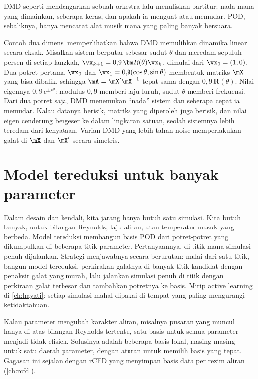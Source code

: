 DMD seperti mendengarkan sebuah orkestra lalu menuliskan partitur: nada mana yang dimainkan, seberapa
keras, dan apakah ia menguat atau memudar. POD, sebaliknya, hanya mencatat alat musik mana yang paling
banyak bersuara.

Contoh dua dimensi memperlihatkan bahwa DMD memulihkan dinamika linear secara eksak. Misalkan sistem berputar sebesar sudut
$\theta$ dan meredam sepuluh persen di setiap langkah, $\vx_{k+1}=0{,}9\,\bm R(\theta)\vx_k$, dimulai dari $\vx_0=(1,0)$. Dua
potret pertama $\vx_0$ dan $\vx_1=0{,}9(\cos\theta,\sin\theta)$ membentuk matriks $\mX$ yang bisa dibalik, sehingga
$\mA=\mX'\mX^{-1}$ tepat sama dengan $0{,}9\,\bm R(\theta)$. Nilai eigennya $0{,}9\,e^{\pm i\theta}$: modulus $0{,}9$ memberi laju
luruh, sudut $\theta$ memberi frekuensi. Dari dua potret saja, DMD menemukan ``nada'' sistem dan seberapa cepat ia memudar.
Kalau datanya berisik, matriks yang diperoleh juga berisik, dan nilai eigen cenderung bergeser ke dalam lingkaran satuan,
seolah sistemnya lebih teredam dari kenyataan. Varian DMD yang lebih tahan noise memperlakukan galat di $\mX$ dan $\mX'$ secara
simetris.

\section{Model tereduksi untuk banyak parameter}

Dalam desain dan kendali, kita jarang hanya butuh satu simulasi. Kita butuh banyak, untuk bilangan Reynolds, laju aliran,
atau temperatur masuk yang berbeda. Model tereduksi  membangun basis POD dari potret-potret yang
dikumpulkan di beberapa titik parameter. Pertanyaannya, di titik mana simulasi penuh dijalankan. Strategi 
menjawabnya secara berurutan: mulai dari satu titik, bangun model tereduksi, perkirakan galatnya di banyak titik kandidat
dengan penaksir galat yang murah, lalu jalankan simulasi penuh di titik dengan perkiraan galat terbesar dan tambahkan
potretnya ke basis. Mirip active learning di \cref{ch:hayati}: setiap simulasi mahal dipakai di tempat yang paling
mengurangi ketidaktahuan.

Kalau parameter mengubah karakter aliran, misalnya pusaran yang muncul hanya di atas bilangan Reynolds tertentu, satu
basis untuk semua parameter menjadi tidak efisien. Solusinya adalah beberapa basis lokal, masing-masing untuk satu daerah
parameter, dengan aturan untuk memilih basis yang tepat. Gagasan ini sejalan dengan rCFD yang menyimpan basis data per
rezim aliran (\cref{ch:rcfd}).

